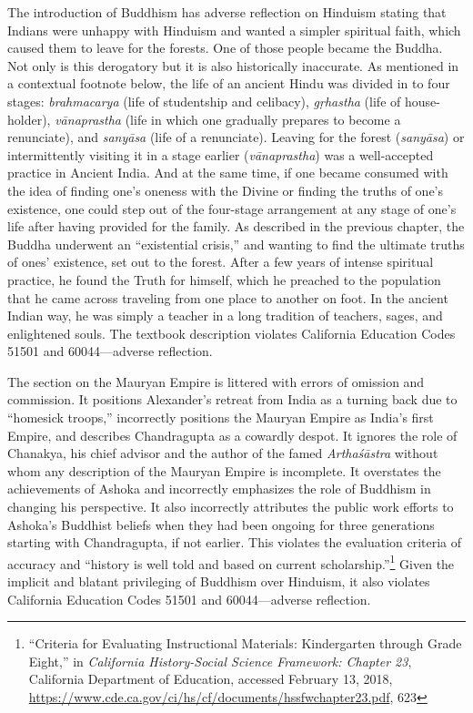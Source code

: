 The introduction of Buddhism has adverse reflection on Hinduism stating that Indians were unhappy with Hinduism and wanted a simpler spiritual faith, which caused them to leave for the forests. One of those people became the Buddha. Not only is this derogatory but it is also historically inaccurate. As mentioned in a contextual footnote below, the life of an ancient Hindu was divided in to four stages: \textit{brahmacarya}  (life of studentship and celibacy), \textit{gṛhastha}  (life of house-holder), \textit{vānaprastha}  (life in which one gradually prepares to become a renunciate), and \textit{sanyāsa}  (life of a renunciate). Leaving for the forest (\textit{sanyāsa}) or intermittently visiting it in a stage earlier (\textit{vānaprastha})  was a well-accepted practice in Ancient India. And at the same time, if one became consumed with the idea of finding one’s oneness with the Divine or finding the truths of one’s existence, one could step out of the four-stage arrangement at any stage of one’s life after having provided for the family. As described in the previous chapter, the Buddha underwent an “existential crisis,” and wanting to find the ultimate truths of ones’ existence, set out to the forest. After a few years of intense spiritual practice, he found the Truth for himself, which he preached to the population that he came across traveling from one place to another on foot. In the ancient Indian way, he was simply a teacher in a long tradition of teachers, sages, and enlightened souls. The textbook description violates California Education Codes 51501 and 60044—adverse reflection.  
\vskip 3pt

The section on the Mauryan Empire is littered with errors of omission and commission. It positions Alexander’s retreat from India as a turning back due to “homesick troops,” incorrectly positions the Mauryan Empire as India’s first Empire, and describes Chandragupta as a cowardly despot. It ignores the role of Chanakya, his chief advisor and the author of the famed \textit{Arthaśāstra}  without whom any description of the Mauryan Empire is incomplete. It overstates the achievements of Ashoka and incorrectly emphasizes the role of Buddhism in changing his perspective. It also incorrectly attributes the public work efforts to Ashoka’s Buddhist beliefs when they had been ongoing for three generations starting with Chandragupta, if not earlier. This violates the evaluation criteria of accuracy and “history is well told and based on current scholarship.”\footnote{“Criteria for Evaluating Instructional Materials: Kindergarten through Grade Eight,” in \textit{California History-Social Science Framework: Chapter 23}, California Department of Education, accessed February 13, 2018, \url{https://www.cde.ca.gov/ci/hs/cf/documents/hssfwchapter23.pdf}, 623} Given the implicit and blatant privileging of Buddhism over Hinduism, it also violates California Education Codes 51501 and 60044—adverse reflection.  
\vskip 3pt

